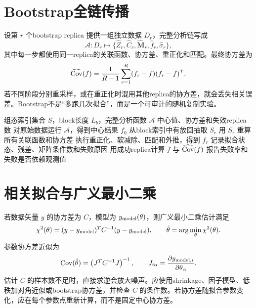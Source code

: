 \documentclass[UTF8,12pt,a4paper,twoside,openany]{ctexbook}
\begin{document}
\section{Bootstrap全链传播}

设第 \(r\) 个bootstrap replica 提供一组独立数据 \(D_r\)，完整分析链写成
\begin{equation}
  \mathcal A:D_r\longmapsto
  \{\widehat Z_r,\widehat C_r,\widehat{\mathbf M}_r,
  \widehat f_r,\widehat{\sigma}_r\},
  \label{eq:bootstrap-chain}
\end{equation}
其中每一步都使用同一replica的关联函数、协方差、重正化和匹配。最终协方差为
\begin{equation}
  \widehat{\rm Cov}(f)
  =\frac{1}{R-1}\sum_{r=1}^{R}
  (f_r-\bar f)(f_r-\bar f)^T.
  \label{eq:bootstrap-cov}
\end{equation}
若不同阶段分别重采样，或在重正化时混用其他replica的协方差，就会丢失相关误差。Bootstrap不是“多跑几次拟合”，而是一个可审计的随机复制实验。

\begin{algorithm}[htbp]
\caption{保留组态相关性的全链bootstrap。}
\label{alg:full-chain-bootstrap}
\begin{algorithmic}[1]
\Require 组态索引集合 \(S\)，block长度 \(L_b\)，完整分析函数 \(\mathcal A\)
\Ensure 中心值、协方差和失效replica数
\State 对原始数据运行 \(\mathcal A\)，得到中心结果 \(f_0\)
  \State 从block索引中有放回抽取 \(S_r\)
  \State 用 \(S_r\) 重算所有关联函数和协方差
  \State 执行重正化、软减除、匹配和外推，得到 \(f_r\)
  \State 记录拟合状态、残差、矩阵条件数和失败原因
\EndFor
\State 用成功replica计算 \(\bar f\) 与 \(\widehat{\rm Cov}(f)\)
\State 报告失败率和失败是否依赖观测值
\end{algorithmic}
\end{algorithm}

\section{相关拟合与广义最小二乘}

若数据矢量 \(y\) 的协方差为 \(C\)，模型为 \(y_{\rm model}(\theta)\)，则广义最小二乘估计满足
\begin{equation}
  \chi^2(\theta)
  =(y-y_{\rm model})^TC^{-1}(y-y_{\rm model}),
  \qquad
  \hat\theta=\arg\min_\theta\chi^2(\theta).
  \label{eq:stats-gls}
\end{equation}
参数协方差近似为
\begin{equation}
  {\rm Cov}(\hat\theta)
  =\left(J^TC^{-1}J\right)^{-1},
  \qquad
  J_{i\alpha}=\frac{\partial y_{{\rm model},i}}{\partial\theta_\alpha}.
  \label{eq:gls-cov}
\end{equation}
估计 \(C\) 的样本数不足时，直接求逆会放大噪声。应使用shrinkage、因子模型、低秩加对角近似或bootstrap协方差，并检查 \(C\) 的条件数。若协方差随拟合参数变化，应在每个参数点重新计算，而不是固定中心协方差。
\end{document}
